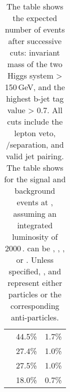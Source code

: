 \begin{table}[!tbp]
\begin{tabular}{lrr}
\gammagamma{\Pphoton}{\BS}{\Pphoton}{\BS}{ \Pquark \Pquark \Pquark \Pquark}& 44.5\%& 1.7\%\\
\gammagamma{\Pphoton}{\BS}{\Pphoton}{\EPA}{ \Pquark \Pquark \Pquark \Pquark}& 27.4\%& 1.0\%\\
\gammagamma{\Pphoton}{\EPA}{\Pphoton}{\BS}{ \Pquark \Pquark \Pquark \Pquark}& 27.5\%& 1.0\%\\
\gammagamma{\Pphoton}{\EPA}{\Pphoton}{\EPA}{ \Pquark \Pquark \Pquark \Pquark} & 18.0\% & 0.7\%\\
\hline \hline
\end{tabular}
\caption
{The table shows the expected number of events after successive cuts: invariant mass of the two Higgs system > 150\,GeV, and the highest b-jet tag value > 0.7. All cuts include the lepton veto, \eeToHHbbWW/\eeToHHbbbb separation, and valid jet pairing. The table shows for the signal and background events at , assuming an integrated luminosity of 2000\,. \Pquark can be \Pup, \Pdown, \Pstrange, \Pbottom or \Ptop. Unless specified, \Pquark, \Plepton and \Pnu represent either particles or the corresponding anti-particles.
}
\label{tab:doubleHiggs3TeVPreslectionPart2}
\end{table}


%
